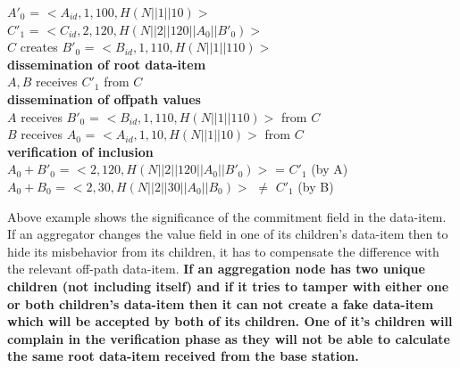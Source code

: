 \begin{exmp}
\begin{itemize}
		$A'_{0}$ = $<A_{id},1,100, H(N||1||10)>$\\
		$C'_{1}$ = $<C_{id},2,120, H(N||2||120||A_{0}||B'_{0})>$\\
		$C$ creates $B'_{0}$ = $<B_{id},1,110, H(N||1||110)>$\\
		\textbf{dissemination of root data-item}\\
			$A,B$ receives $C'_{1}$ from $C$\\
		\textbf{dissemination of offpath values}\\
			$A$ receives $B'_{0}$ = $<B_{id},1,110, H(N||1||110)>$ from $C$\\
			$B$ receives $A_{0}$ = $<A_{id},1,10,H(N||1||10)>$ from $C$\\
		\textbf{verification of inclusion}\\
			$A_{0}+B'_{0}$ = $<2,120,H(N||2||120||A_{0}||B'_{0})>$ = $C'_{1}$ (by A)\\
			$A_{0}+B_{0}$ = $<2,30,H(N||2||30||A_{0}||B_{0})>$ $\neq$ $C'_{1} $ (by B)
	\end{itemize}
	\end{exmp}
Above example shows the significance of the commitment field in the data-item.
If an aggregator changes the value field in one of its children's data-item then to hide its misbehavior from its children, it has to compensate the difference with the relevant off-path data-item. 
\textbf{If an aggregation node has two unique children (not including itself) and if it tries to tamper with either one or both children's data-item then it can not create a fake data-item which will be accepted by both of its children.
One of it's children will complain in the verification phase as they will not be able to calculate the same root data-item received from the base station.}

